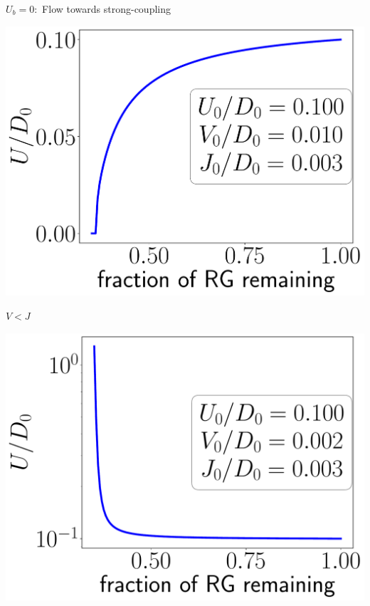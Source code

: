 \documentclass[aspectratio=169]{beamer}
\begin{document}
\begin{frame}[noframenumbering]{\(U_b = 0:\) Flow towards strong-coupling}
{\begin{minipage}{0.49\textwidth}
\includegraphics[width=\textwidth]{figures/U_irr,U_gt_0,U.pdf}
\end{minipage}
\begin{minipage}{0.49\textwidth}
\centering
{\large\( V < J\)}

\includegraphics[width=\textwidth]{figures/U_rel,U_gt_0,U.pdf}
\end{minipage}
}

\end{frame}
\end{document}
